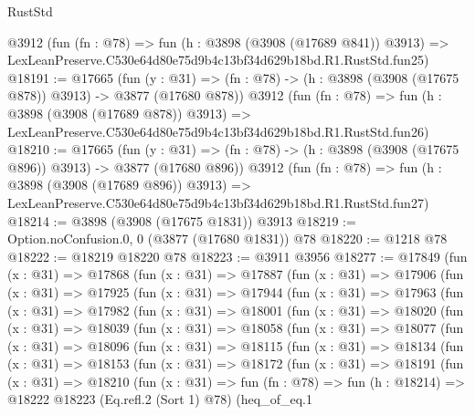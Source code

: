 \begin{lexlean}{RustStd}
\begin{coremodule}
    @3912
    (fun (fn : @78) =>
    fun (h : @3898 (@3908 (@17689 @841)) @3913) =>
    LexLeanPreserve.C530e64d80e75d9b4c13bf34d629b18bd.R1.RustStd.fun25)
@18191 := @17665
    (fun (y : @31) => (fn : @78) -> (h : @3898 (@3908 (@17675 @878)) @3913) -> @3877 (@17680 @878))
    @3912
    (fun (fn : @78) =>
    fun (h : @3898 (@3908 (@17689 @878)) @3913) =>
    LexLeanPreserve.C530e64d80e75d9b4c13bf34d629b18bd.R1.RustStd.fun26)
@18210 := @17665
    (fun (y : @31) => (fn : @78) -> (h : @3898 (@3908 (@17675 @896)) @3913) -> @3877 (@17680 @896))
    @3912
    (fun (fn : @78) =>
    fun (h : @3898 (@3908 (@17689 @896)) @3913) =>
    LexLeanPreserve.C530e64d80e75d9b4c13bf34d629b18bd.R1.RustStd.fun27)
@18214 := @3898 (@3908 (@17675 @1831)) @3913
@18219 := Option.noConfusion.{0, 0} (@3877 (@17680 @1831)) @78
@18220 := @1218 @78
@18222 := @18219 @18220 @78
@18223 := @3911 @3956
@18277 := @17849
    (fun (x : @31) =>
    @17868
      (fun (x : @31) =>
      @17887
        (fun (x : @31) =>
        @17906
          (fun (x : @31) =>
          @17925
            (fun (x : @31) =>
            @17944
              (fun (x : @31) =>
              @17963
                (fun (x : @31) =>
                @17982
                  (fun (x : @31) =>
                  @18001
                    (fun (x : @31) =>
                    @18020
                      (fun (x : @31) =>
                      @18039
                        (fun (x : @31) =>
                        @18058
                          (fun (x : @31) =>
                          @18077
                            (fun (x : @31) =>
                            @18096
                              (fun (x : @31) =>
                              @18115
                                (fun (x : @31) =>
                                @18134
                                  (fun (x : @31) =>
                                  @18153
                                    (fun (x : @31) =>
                                    @18172
                                      (fun (x : @31) =>
                                      @18191
                                        (fun (x : @31) =>
                                        @18210
                                          (fun (x : @31) =>
                                          fun (fn : @78) =>
                                          fun (h : @18214) =>
                                          @18222
                                            @18223
                                            (Eq.refl.{2} (Sort 1) @78)
                                            (heq_of_eq.{1}

\end{coremodule}
\end{lexlean}

